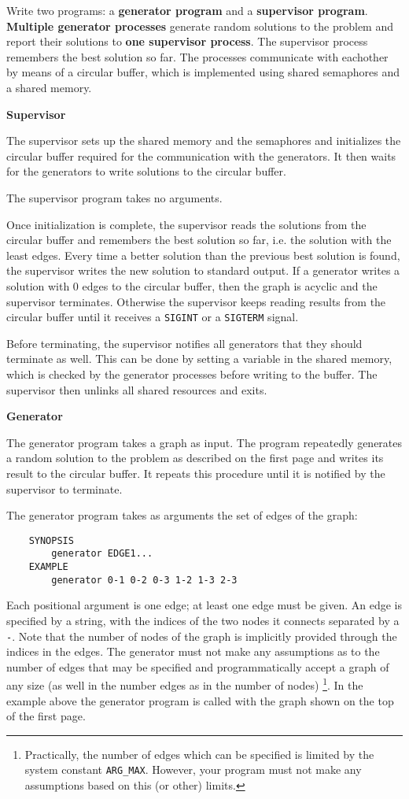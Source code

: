 Write two programs: a \textbf{generator program} and a \textbf{supervisor program}.
\textbf{Multiple generator processes} generate random solutions to the problem
and report their solutions to \textbf{one supervisor process}.
The supervisor process remembers the best solution so far.
The processes communicate with eachother by means of a circular buffer,
which is implemented using shared semaphores and a shared memory.

\textbf{Supervisor}

The supervisor sets up the shared memory and the semaphores
and initializes the circular buffer
required for the communication with the generators.
It then waits for the generators to write solutions to the circular buffer.

The supervisor program takes no arguments.

Once initialization is complete,
the supervisor reads the solutions from the circular buffer
and remembers the best solution so far, i.e. the solution with the least edges.
Every time a better solution than the previous best solution is found,
the supervisor writes the new solution to standard output.
If a generator writes a solution with 0 edges to the circular buffer,
then the graph is acyclic and the supervisor terminates.
Otherwise the supervisor keeps reading results from the circular buffer
until it receives a \texttt{SIGINT} or a \texttt{SIGTERM} signal.

Before terminating, the supervisor notifies all generators
that they should terminate as well.
This can be done by setting a variable in the shared memory,
which is checked by the generator processes before writing to the buffer.
The supervisor then unlinks all shared resources and exits.

\textbf{Generator}

The generator program takes a graph as input.
The program repeatedly generates a random solution to the problem as described on the first page
and writes its result to the circular buffer.
It repeats this procedure until it is notified by the supervisor to terminate.

The generator program takes as arguments the set of edges of the graph:

\begin{verbatim}
    SYNOPSIS
        generator EDGE1...
    EXAMPLE
        generator 0-1 0-2 0-3 1-2 1-3 2-3
\end{verbatim}

Each positional argument is one edge; at least one edge must be given.
An edge is specified by a string,
with the indices of the two nodes it connects separated by a \texttt{-}.
Note that the number of nodes of the graph is implicitly provided
through the indices in the edges.
The generator must not make any assumptions as to the number of edges that may be specified
and programmatically accept a graph of any size
(as well in the number edges as in the number of nodes)
\footnote{
Practically, the number of edges which can be specified is limited by the system constant \texttt{ARG\_MAX}.
However, your program must not make any assumptions based on this (or other) limits.
}.
In the example above the generator program is called with the graph shown on the top of the first page.

